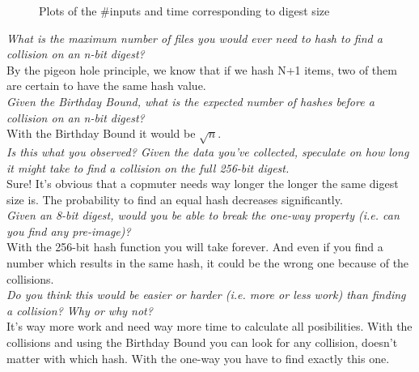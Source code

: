 \begin{figure}[h]
    \centering
    \caption{Plots of the \#inputs and time corresponding to digest size}
\end{figure}


\textit{What is the maximum number of files you would ever need to hash to find a collision on an n-bit digest?} \\
By the pigeon hole principle, we know that if we hash N+1 items, two of them are certain to have the same hash value.\\

\textit{Given the Birthday Bound, what is the expected number of hashes before a collision on an n-bit digest?}\\
With the Birthday Bound it would be $\sqrt{n}$.\\

\textit{Is this what you observed? Given the data you’ve collected, speculate on how long it might take to find a collision on the full 256-bit digest.} \\
Sure! It's obvious that a copmuter needs way longer the longer the same digest size is. The probability to find an equal hash decreases significantly.\\

\textit{Given an 8-bit digest, would you be able to break the one-way property (i.e. can you find any pre-image)?}\\
With the 256-bit hash function you will take forever. And even if you find a number which results in the same hash, it could be the wrong one because of the collisions.\\

\textit{Do you think this would be easier or harder (i.e. more or less work) than finding a collision? Why or why not?}\\
It's way more work and need way more time to calculate all posibilities. With the collisions and using the Birthday Bound you can look for any collision, doesn't matter with which hash. With the one-way you have to find exactly this one.